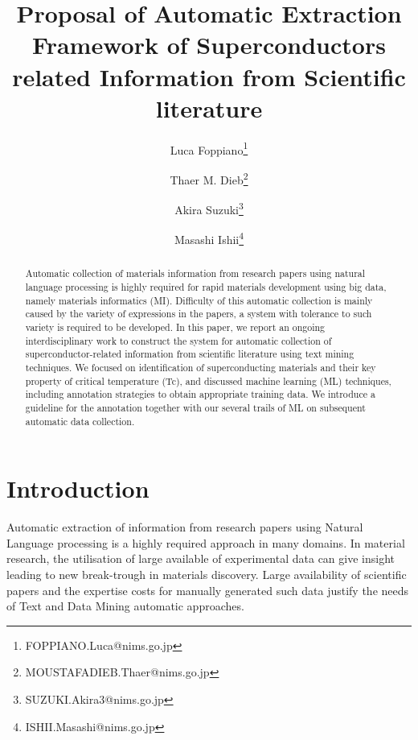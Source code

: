 \documentclass{article}[a4]
\title{Proposal of Automatic Extraction Framework of Superconductors related Information from Scientific literature}
\author[1]{Luca Foppiano\thanks{FOPPIANO.Luca@nims.go.jp}}
\author[1]{Thaer M. Dieb\thanks{MOUSTAFADIEB.Thaer@nims.go.jp}}
\author[1]{Akira Suzuki\thanks{SUZUKI.Akira3@nims.go.jp}}
\author[1]{Masashi Ishii\thanks{ISHII.Masashi@nims.go.jp}}
\affil[1]{Research and Services Division of Materials Data and Integrated System (MaDIS), National Institute for Materials Science (NIMS), 1-2-1 Sengen, Tsukuba, Ibaraki 305-0047, Japan}
\begin{document}
\maketitle

\begin{abstract}
Automatic collection of materials information from research papers using natural language processing is highly required for rapid materials development using big data, namely materials informatics (MI). Difficulty of this automatic collection is mainly caused by the variety of expressions in the papers, a system with tolerance to such variety is required to be developed. 
In this paper, we report an ongoing interdisciplinary work to construct the system for automatic collection of superconductor-related information from scientific literature using text mining techniques. We focused on identification of superconducting materials and their key property of critical temperature (Tc), and discussed machine learning (ML) techniques, including annotation strategies to obtain appropriate training data. We introduce a guideline for the annotation together with our several trails of ML on subsequent automatic data collection.
\end{abstract}

\pagebreak





\section{Introduction}

Automatic extraction of information from research papers using Natural Language processing is a highly required approach in many domains. In material research, the utilisation of large available of experimental data can give insight leading to new break-trough in materials discovery. Large availability of scientific papers and the expertise costs for manually generated such data justify the needs of Text and Data Mining automatic approaches.
\end{document}
